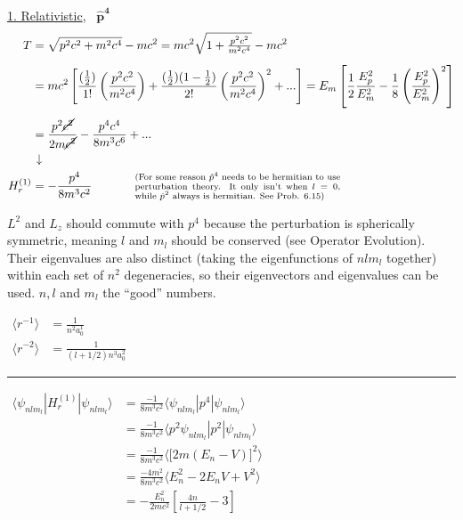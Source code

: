 \documentclass[12pt]{article}
\newcommand{\hs}{\hspace{1pt}} %
\begin{document}
\vspace{15pt}\noindent
\underline{1. Relativistic}, \ \(\boldsymbol{\hat{p}^4}\)
\begin{align*}
    T & = \sqrt{p^2c^2 + m^2c^4} - mc^2 
        = mc^2 \sqrt{1 + \tfrac{p^2c^2}{m^2c^4}} - mc^2
        \\[5pt]
    & = mc^2 \left[
            \frac{ (\tfrac{1}{2}) }{1!} \left( \frac{p^2c^2}{m^2c^4} \right) 
            + \frac{ (\tfrac{1}{2}) (1 - \tfrac{1}{2}) }{2!} \left( \frac{p^2c^2}{m^2c^4} \right)^2  + ...
        \right]
        = E_m \left[ \frac{1}{2} \frac{E^2_p}{E^2_m} - \frac{1}{8} \left( \frac{E^2_p}{E^2_m} \right)^2 \right]
        \\[5pt]
    & = \frac{p^2\cancel{c^2}}{2m\cancel{c^2}} - \frac{p^4c^4}{8 m^3 c^6} + ...\\
    & \hs \downarrow\\
    H^{(1)}_r & = - \frac{p^4}{8 m^3 c^2} 
        \hspace{18pt} \hspace{18pt}
        \parbox{.5\textwidth}{
            \scriptsize(For some reason \(\hat{p}^4\) needs to be hermitian to use perturbation theory. 
            It only isn't when \(l=0\), while \(\hat{p}^2\) always is hermitian. See Prob. 6.15)    
        }
\end{align*}

\vspace{5pt} \noindent
\(L^2\) and \(L_z\) should commute with \(p^4\) because the perturbation is spherically symmetric, meaning 
\(l\) and \(m_l\) should be conserved (see Operator Evolution). Their eigenvalues are also distinct 
(taking the eigenfunctions of \(nlm_l\) together) within each set of \(n^2\) degeneracies, so their eigenvectors and 
eigenvalues can be used. \(n, l\) and \(m_l\) the ``good'' numbers.

\vspace{10pt}
\(\begin{aligned}
    \langle r^{-1} \rangle &= \tfrac{1}{n^2 a_0^1 }\\[5pt]
    \langle r^{-2} \rangle &= \tfrac{1}{ (l + 1/2) n^3 a_0^2 }
\end{aligned}\)
\hspace{10pt}
\rule[-85pt]{.5pt}{170pt}
\hspace{10pt}
\(\begin{aligned}
    \langle \psi_{nlm_l} | H^{(1)}_r | \psi_{nlm_l} \Big\rangle 
        &= \frac{- 1}{8 m^3 c^2} \langle \psi_{nlm_l} | p^4 | \psi_{nlm_l} \rangle\\[5pt]
    &= \frac{- 1}{8 m^3 c^2} \langle p^2 \psi_{nlm_l} | p^2 | \psi_{nlm_l} \rangle\\[5pt]
    &= \frac{- 1}{8 m^3 c^2} \Big\langle \big[ 2m(E_n-V) \big]^2 \Big\rangle\\[5pt]
    &= \frac{- 4m^2}{8 m^3 c^2} \langle E_n^2 -2E_nV + V^2 \rangle\\[5pt]
    &= - \frac{E_n^2}{2mc^2} \left[ \frac{4n}{l + 1/2} - 3\right]
\end{aligned}\)
\end{document}
